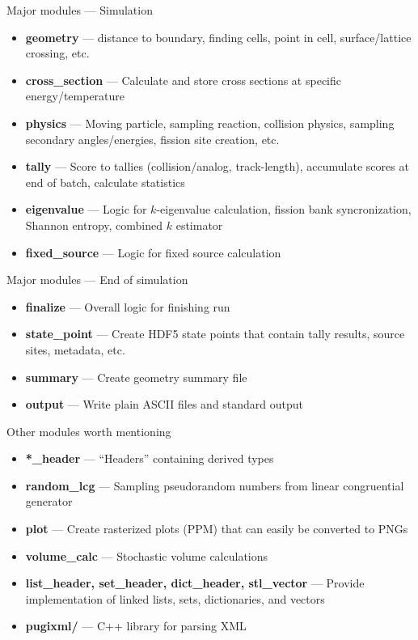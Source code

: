 \documentclass[noamssymb,svgnames]{beamer}
\begin{document}
\begin{frame}{Major modules --- Simulation}
  \begin{itemize}
  \item\textbf{geometry} --- distance to boundary, finding cells, point in
    cell, surface/lattice crossing, etc.
  \item\textbf{cross\_section} --- Calculate and store cross sections at
    specific energy/temperature
  \item\textbf{physics} --- Moving particle, sampling reaction, collision
    physics, sampling secondary angles/energies, fission site creation, etc.
  \item\textbf{tally} --- Score to tallies (collision/analog, track-length),
    accumulate scores at end of batch, calculate statistics
  \item\textbf{eigenvalue} --- Logic for $k$-eigenvalue calculation, fission
    bank syncronization, Shannon entropy, combined $k$ estimator
  \item\textbf{fixed\_source} --- Logic for fixed source calculation
  \end{itemize}
\end{frame}

\begin{frame}{Major modules --- End of simulation}
  \begin{itemize}
  \item\textbf{finalize} --- Overall logic for finishing run
  \item\textbf{state\_point} --- Create HDF5 state points that contain tally
    results, source sites, metadata, etc.
  \item\textbf{summary} --- Create geometry summary file
  \item\textbf{output} --- Write plain ASCII files and standard output
  \end{itemize}
\end{frame}

\begin{frame}{Other modules worth mentioning}
  \begin{itemize}
  \item\textbf{*\_header} --- ``Headers'' containing derived types
  \item\textbf{random\_lcg} --- Sampling pseudorandom numbers from linear
    congruential generator
  \item\textbf{plot} --- Create rasterized plots (PPM) that can easily be
    converted to PNGs
  \item\textbf{volume\_calc} --- Stochastic volume calculations
  \item\textbf{list\_header, set\_header, dict\_header, stl\_vector} --- Provide
    implementation of linked lists, sets, dictionaries, and vectors
  \item\textbf{pugixml/} --- C++ library for parsing XML
  \end{itemize}
\end{frame}
\end{document}
